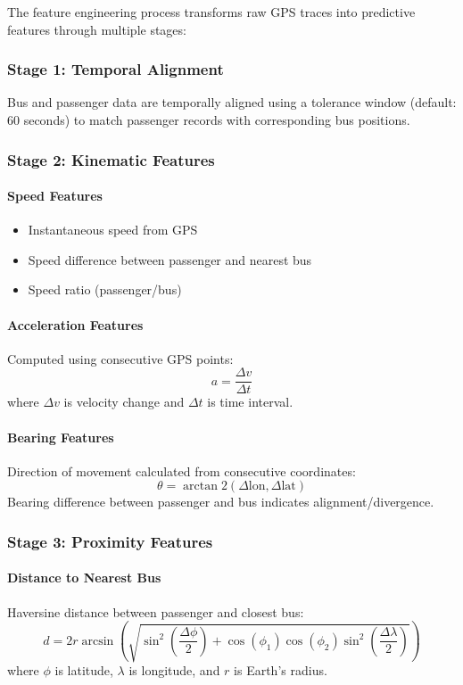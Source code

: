 The feature engineering process transforms raw GPS traces into predictive features through multiple stages:

\subsubsection{Stage 1: Temporal Alignment}
Bus and passenger data are temporally aligned using a tolerance window (default: 60 seconds) to match passenger records with corresponding bus positions.

\subsubsection{Stage 2: Kinematic Features}
\paragraph{Speed Features}
\begin{itemize}
    \item Instantaneous speed from GPS
    \item Speed difference between passenger and nearest bus
    \item Speed ratio (passenger/bus)
\end{itemize}

\paragraph{Acceleration Features}
Computed using consecutive GPS points:
\begin{equation}
    a = \frac{\Delta v}{\Delta t}
\end{equation}
where $\Delta v$ is velocity change and $\Delta t$ is time interval.

\paragraph{Bearing Features}
Direction of movement calculated from consecutive coordinates:
\begin{equation}
    \theta = \arctan2(\Delta \text{lon}, \Delta \text{lat})
\end{equation}
Bearing difference between passenger and bus indicates alignment/divergence.

\subsubsection{Stage 3: Proximity Features}
\paragraph{Distance to Nearest Bus}
Haversine distance between passenger and closest bus:
\begin{equation}
    d = 2r \arcsin\left(\sqrt{\sin^2\left(\frac{\Delta\phi}{2}\right) + \cos(\phi_1)\cos(\phi_2)\sin^2\left(\frac{\Delta\lambda}{2}\right)}\right)
\end{equation}
where $\phi$ is latitude, $\lambda$ is longitude, and $r$ is Earth's radius.

